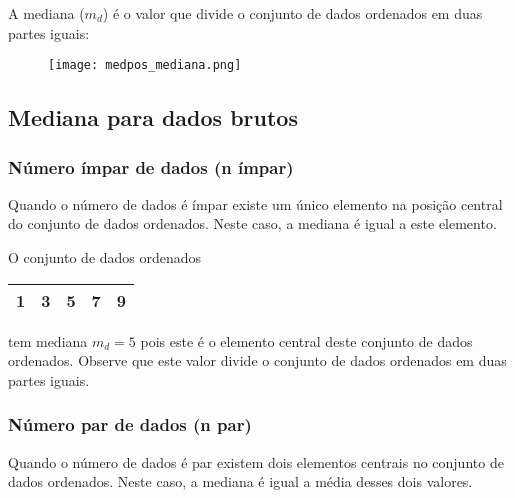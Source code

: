 \documentclass[11pt,fleqn]{book} %
\begin{document}
A mediana ($m_d$) é o valor que divide o conjunto de dados ordenados em duas partes iguais: 


\begin{figure}[h!]
\centering\texttt{[image: medpos\_mediana.png]}
\label{fig:medpos_mediana} %
\end{figure}


\subsection{Mediana para dados brutos}
\vspace{0,3cm}

\subsubsection{Número ímpar de dados (n ímpar)}
\vspace{0,3cm}

Quando o número de dados é ímpar existe um único elemento na posição central do conjunto de dados ordenados. Neste caso, a mediana é igual a este elemento. \\


\begin{example}

O conjunto de dados ordenados 

\begin{center}
	\begin{tabular}{c c c c c}
	\hline
	1 & 3 & 5 & 7 & 9 \\
	\hline
	\end{tabular}
\end{center}

\noindent tem mediana $m_d=5$ pois este é o elemento central deste conjunto de dados ordenados. Observe que este valor divide o conjunto de dados ordenados em duas partes iguais.

\end{example}

\vspace{0,3cm}

\subsubsection{Número par de dados (n par)}
\vspace{0,3cm}

Quando o número de dados é par existem dois elementos centrais no conjunto de dados ordenados. Neste caso, a mediana é igual a média desses dois valores. \\
\end{document}
